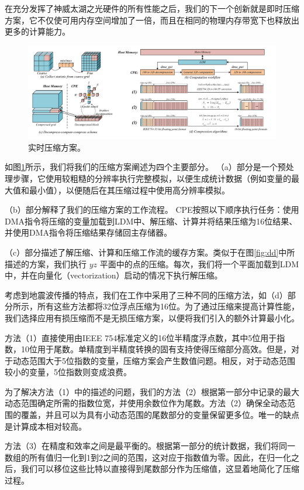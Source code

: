 \documentclass[degree=doctor]{thuthesis}
\begin{document}
在充分发挥了神威太湖之光硬件的所有性能之后，我们的下一个创新就是即时压缩方案，它不仅使可用内存空间增加了一倍，而且在相同的物理内存带宽下也释放出更多的计算能力。

\begin{figure}[ht]
\centering

\includegraphics[width=1.0\textwidth]{compression.pdf}
\caption{实时压缩方案。}
\label{fig:compression}
\end{figure}

如图\ref{fig:compression}所示，我们将我们的压缩方案阐述为四个主要部分。 （a）部分是一个预处理步骤，它使用较粗糙的分辨率执行完整模拟，以便生成统计数据（例如变量的最大值和最小值），以便随后在其压缩过程中使用高分辨率模拟。

（b）部分解释了我们的压缩方案的工作流程。 CPE按照以下顺序执行任务：使用DMA指令将压缩的变量加载到LDM中、解压缩、计算并将结果压缩为16位结果、并使用DMA指令将压缩结果存储回主存储器。

（c）部分描述了解压缩、计算和压缩工作流的缓存方案。类似于在图\ref{fig:dd}中所描述的方案，我们执行 $ yz $ 平面中的点的压缩。每次，我们将一个平面加载到LDM中，并在向量化（vectorization）启动的情况下执行解压缩。

考虑到地震波传播的特点，我们在工作中采用了三种不同的压缩方法，如（d）部分所示，所有这些方法都将32位浮点压缩为16位。为了通过压缩来提高计算性能，我们选择应用有损压缩而不是无损压缩方案，以便将我们引入的额外计算最小化。

方法（1）直接使用由IEEE 754标准定义的16位半精度浮点数，其中5位用于指数，10位用于尾数。单精度到半精度转换的固有支持使得压缩部分高效。但是，对于动态范围大于5位指数的变量，压缩方案会产生数值问题。相反，对于动态范围较小的变量，5位指数则变成浪费。

为了解决方法（1）中的描述的问题，我们的方法（2）根据第一部分中记录的最大动态范围确定所需的指数位宽，并使用余数位作为尾数。方法（2）确保全动态范围的覆盖，并且可以为具有小动态范围的尾数部分的变量保留更多位。唯一的缺点是计算成本相对较高。

方法（3）在精度和效率之间是最平衡的。根据第一部分的统计数据，我们将同一数组的所有值归一化到1到2之间的范围，这对应于指数值为零。因此，在归一化之后，我们可以移位这些比特以直接得到尾数部分作为压缩值，这显着地简化了压缩过程。
\end{document}
